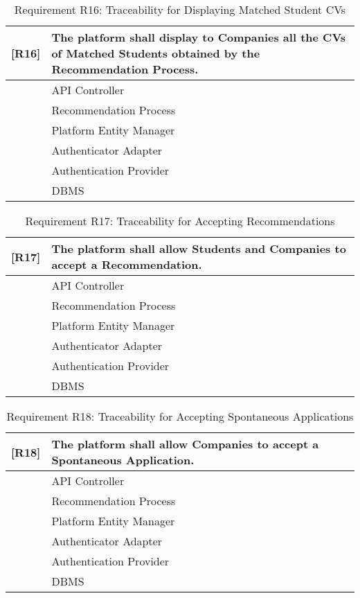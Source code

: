 \begin{table}[H]
    \centering
    \begin{tabular}{|p{1cm}|p{14cm}|}
    \hline
    \textbf{[R16]} & \textbf{The platform shall display to Companies all the CVs of Matched Students obtained by the Recommendation Process.} \\ \hline
    [C1] & API Controller \\ \hline
    [C4] & Recommendation Process \\ \hline
    [C10] & Platform Entity Manager \\ \hline
    [C11] & Authenticator Adapter \\ \hline
    [E3] & Authentication Provider \\ \hline
    [E4] & DBMS \\ \hline
    \end{tabular}
    \caption{Requirement R16: Traceability for Displaying Matched Student CVs}
    \label{tab:RT16}
\end{table}


\begin{table}[H]
    \centering
    \begin{tabular}{|p{1cm}|p{14cm}|}
    \hline
    \textbf{[R17]} & \textbf{The platform shall allow Students and Companies to accept a Recommendation.} \\ \hline
    [C1] & API Controller \\ \hline
    [C4] & Recommendation Process \\ \hline
    [C10] & Platform Entity Manager \\ \hline
    [C11] & Authenticator Adapter \\ \hline
    [E3] & Authentication Provider \\ \hline
    [E4] & DBMS \\ \hline
    \end{tabular}
    \caption{Requirement R17: Traceability for Accepting Recommendations}
    \label{tab:RT17}
\end{table}

\begin{table}[H]
    \centering
    \begin{tabular}{|p{1cm}|p{14cm}|}
    \hline
    \textbf{[R18]} & \textbf{The platform shall allow Companies to accept a Spontaneous Application.} \\ \hline
    [C1] & API Controller \\ \hline
    [C4] & Recommendation Process \\ \hline
    [C10] & Platform Entity Manager \\ \hline
    [C11] & Authenticator Adapter \\ \hline
    [E3] & Authentication Provider \\ \hline
    [E4] & DBMS \\ \hline
    \end{tabular}
    \caption{Requirement R18: Traceability for Accepting Spontaneous Applications}
    \label{tab:RT18}
\end{table}

